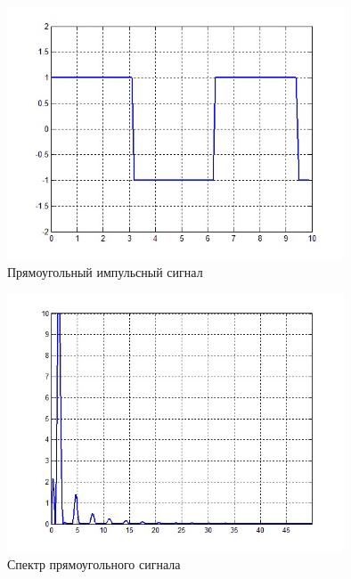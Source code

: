 \documentclass[10pt,a4paper]{article}
\begin{document}
\begin{figure}[h]
\centering
\includegraphics[width=10cm]{5_3} 
\caption{Прямоугольный импульсный сигнал} 
\label{fig.l5_3} 
\end{figure}
\begin{figure}[h]
\centering
\includegraphics[width=10cm]{5_4}
\caption{Спектр прямоугольного сигнала} 
\label{fig.l5_4} 
\end{figure}
\end{document}
